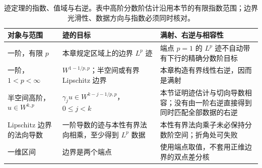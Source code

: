 \begin{table}[htbp]
\centering\small\renewcommand{\arraystretch}{1.18}\setlength{\tabcolsep}{4pt}
\caption[迹定理的指数、值域与右逆]{迹定理的指数、值域与右逆。表中高阶分数阶估计沿用本节的有限指数范围；边界光滑性、数据方向与指数必须同时核对。}
\label{b1:tab:visual-t12}
\begin{tabularx}{\linewidth}{@{}>{\raggedright\arraybackslash}p{3.1cm}>{\raggedright\arraybackslash}p{4.7cm}>{\raggedright\arraybackslash}X@{}}
\toprule
对象与范围 & 迹的目标 & 满射、右逆与相容性 \\
\midrule
一阶，有限 \(p\) & 本章规定区域上的边界 \(L^p\) 迹 & 端点 \(p=1\) 的 \(L^p\) 迹不自动带有下行的精确分数阶目标 \\
一阶，\(1<p<\infty\) & \(W^{1-1/p,p}\)；半空间或有界 Lipschitz 边界 & 本章构造有界线性右逆，因而是满射 \\
半空间高阶，\(u\in W^{k,p}\) & \(\gamma_j u\in W^{k-j-1/p,p}\)，\(0\le j<k\) & 本节证明迹估计与切向导数相容；没有由一阶右逆直接得到同时匹配全部数据的右逆 \\
Lipschitz 边界的法向导数 & 一阶导数的迹与本性有界法向相乘，至少得到 \(L^p\) 数据 & 本性有界法向乘子未必保持分数阶空间；折角处可失败 \\
一维区间 & 边界是两个端点 & 使用端点取值，不套用正维边界的双点差分核 \\
\bottomrule
\end{tabularx}
\end{table}
